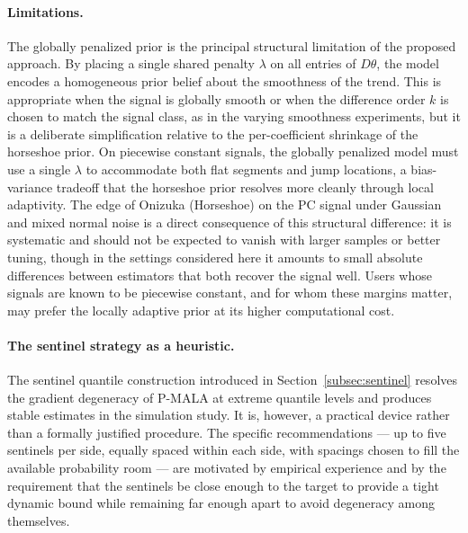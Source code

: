 \paragraph{Limitations.}
The globally penalized prior is the principal structural limitation of the proposed approach. By placing a single shared penalty $\lambda$ on all entries of $D\theta$, the model encodes a homogeneous prior belief about the smoothness of the trend. This is appropriate when the signal is globally smooth or when the difference order $k$ is chosen to match the signal class, as in the varying smoothness experiments, but it is a deliberate simplification relative to the per-coefficient shrinkage of the horseshoe prior. On piecewise constant signals, the globally penalized model must use a single $\lambda$ to accommodate both flat segments and jump locations, a bias-variance tradeoff that the horseshoe prior resolves more cleanly through local adaptivity. The edge of Onizuka (Horseshoe) on the PC signal under Gaussian and mixed normal noise is a direct consequence of this structural difference: it is systematic and should not be expected to vanish with larger samples or better tuning, though in the settings considered here it amounts to small absolute differences between estimators that both recover the signal well. Users whose signals are known to be piecewise constant, and for whom these margins matter, may prefer the locally adaptive prior at its higher computational cost.

\paragraph{The sentinel strategy as a heuristic.}
The sentinel quantile construction introduced in Section~\ref{subsec:sentinel} resolves the gradient degeneracy of P-MALA at extreme quantile levels and produces stable estimates in the simulation study. It is, however, a practical device rather than a formally justified procedure. The specific recommendations --- up to five sentinels per side, equally spaced within each side, with spacings chosen to fill the available probability room --- are motivated by empirical experience and by the requirement that the sentinels be close enough to the target to provide a tight dynamic bound while remaining far enough apart to avoid degeneracy among themselves. 

